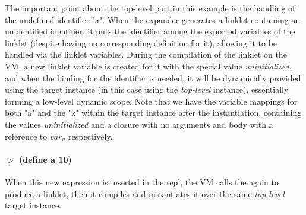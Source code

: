 The important point about the top-level part in this example is the
handling of the undefined identifier "a". When the expander generates
a linklet containing an unidentified identifier, it puts the
identifier among the exported variables of the linklet (despite having
no corresponding definition for it), allowing it to be handled via the
linklet variables. During the compilation of the linklet on the VM, a
new linklet variable is created for it with the special value
\emph{uninitialized}, and when the binding for the identifier is
needed, it will be dynamically provided using the target instance (in
this case using the \emph{top-level} instance), essentially forming a
low-level dynamic scope. Note that we have the variable mappings for
both "a" and the "k" within the target instance after the
instantiation, containing the values \emph{uninitialized} and a
closure with no arguments and body with a reference to $var_a$
respectively.

\paragraph{$>$ (define a 10)}

When this new expression is inserted in the repl, the VM calls the
 again to produce a linklet, then it compiles and
instantiates it over the same \emph{top-level} target instance.



